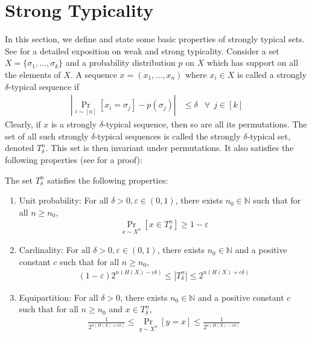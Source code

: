 \documentclass[11pt]{article}
\renewcommand{\epsilon}{\varepsilon}
\begin{document}
\section{Strong Typicality}\label{app:typical}
In this section, we define and state some basic properties of strongly typical sets. See \cite{wilde2013quantum} for a detailed exposition on weak and strong typicality. Consider a set $X = \{\sigma_1, \ldots, \sigma_k\}$ and a probability distribution $p$ on $X$ which has support on all the elements of $X$. A sequence $x = (x_1, \ldots, x_n)$ where $x_i \in X$ is called a strongly $\delta$-typical sequence if
\begin{align*}
    \left|\Pr_{i \sim [n]}[x_i = \sigma_j] - p(\sigma_j)\right| &\leq \delta &\forall~~j \in [k]
\end{align*}
Clearly, if $x$ is a strongly $\delta$-typical sequence, then so are all its permutations. The set of all such strongly $\delta$-typical sequences is called the strongly $\delta$-typical set, denoted $T_{\delta}^n$. This set is then invariant under permutations. It also satisfies the following properties (see \cite{wilde2013quantum} for a proof):
\begin{fact}\label{fact:proptypical}
    The set $T_{\delta}^n$ satisfies the following properties:
    \begin{enumerate}
        \item Unit probability: For all $\delta > 0, \epsilon \in (0,1)$, there exists $n_0 \in \mathbb{N}$ such that for all $n \geq n_0$,
        \begin{align*}
            \Pr_{x \sim X^n}[x \in T_{\delta}^n] \geq 1-\epsilon
        \end{align*}
        \item Cardinality: For all $\delta > 0, \epsilon \in (0,1)$, there exists $n_0 \in \mathbb{N}$ and a positive constant $c$ such that for all $n \geq n_0$,
        \begin{align*}
             (1-\epsilon) 2^{n(H(X)-c\delta)} \leq |T_{\delta}^n| \leq 2^{n(H(X)+c\delta)}
        \end{align*}
        \item Equipartition: For all $\delta > 0$, there exists $n_0 \in \mathbb{N}$ and a positive constant $c$ such that for all $n \geq n_0$ and $x \in T_{\delta}^n$,
        \begin{align*}
             \frac{1}{2^{n(H(X)+c\delta)}} \leq \Pr_{y \sim X^n}[y = x] \leq \frac{1}{2^{n(H(X)-c\delta)}}
        \end{align*}
    \end{enumerate}
\end{fact}
\end{document}
